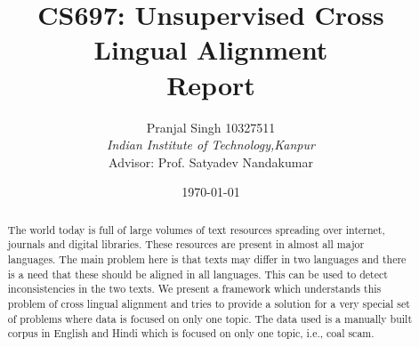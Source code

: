 \documentclass{article}
\title{\textbf{CS697: Unsupervised Cross Lingual Alignment\\} Report}
\author{\normalsize Pranjal Singh 10327511\\
\emph{Indian Institute of Technology,Kanpur}\\ Advisor: Prof. Satyadev Nandakumar}
\date{\today}
\begin{document}
\maketitle
\begin{abstract}
The world today is full of large volumes of text resources spreading over internet, journals and digital libraries. These resources are present in almost all major languages. The main problem here is that texts may differ in two languages and there is a need that these should be aligned in all languages. This can be used to detect inconsistencies in the two texts. We present a framework which understands this problem of cross lingual alignment and tries to provide a solution for a very special set of problems where data is focused on only one topic. The data used is a manually built corpus in English and Hindi which is focused on only one topic, i.e., coal scam.
\end{abstract}
\end{document}

